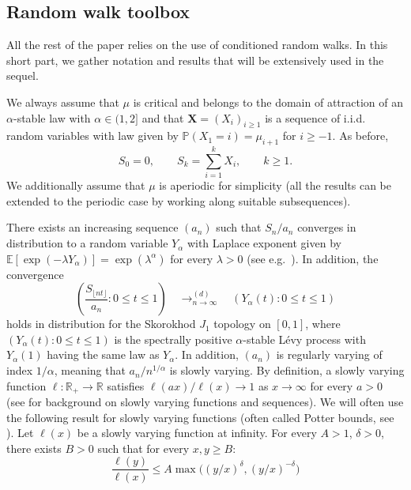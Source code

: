 \documentclass[a4paper,11pt]{article}
\DeclareRobustCommand{\P}{\mathbb{P}}
\DeclareRobustCommand{\1}{\mathbf{1}}
\newcommand{\R}{\mathbb{R}}
\newcommand\Es[1]{\mathbb{E}\left[#1\right]}
\begin{document}
\subsection{Random walk toolbox}
\label{sec:toolbox}

All the rest of the paper relies on the use of conditioned random walks. In this short part, we gather notation and results that will be extensively used in the sequel.

We always assume that $\mu$ is critical and belongs to the domain of attraction of an $\alpha$-stable law with $\alpha \in (1,2]$ and that $\mathbf{X}=(X_i)_{i \geq 1}$ is a sequence of i.i.d. random variables with law given by $\P(X_{1}=i)=\mu_{i+1}$ for $i \geq -1$. As before,
$$S_0 = 0, \qquad S_k = \sum_{i=1}^k X_i, \qquad k \geq 1.$$
We additionally assume that $\mu$ is aperiodic for simplicity (all the results can be extended to the periodic case by working along suitable subsequences).

There exists an increasing sequence $(a_{n})$ such that $S_{n}/a_{n}$ converges in distribution to a random variable $Y_{\alpha}$ with Laplace exponent given by $\Es{ \exp(- \lambda Y_{\alpha})}= \exp(\lambda ^ \alpha)$ for every $\lambda>0$ (see e.g.~\cite[Sec.~XVII.5]{Fel71}). In addition, the convergence
\begin{equation}
\label{eq:cvlaw}  \left(\frac{S_{\lfloor  n t \rfloor}}{a_{n}} : 0 \leq t \leq  1 \right) \quad \mathop{\longrightarrow}^{(d)}_{n \rightarrow \infty} \quad (Y_{\alpha}(t): 0 \leq t \leq 1)
\end{equation}
holds in distribution for the Skorokhod $J_{1}$ topology on $[0,1]$, where $ (Y_{\alpha}(t): 0 \leq t \leq 1)$ is the spectrally positive $\alpha$-stable Lévy process with $Y_{\alpha}(1)$ having the same law as $Y_{\alpha}$. In addition, $(a_{n})$ is regularly varying of index $1/\alpha$, meaning that $a_{n}/n^{1/\alpha}$ is slowly varying. By definition, a slowly varying function $\ell : \R_{+} \rightarrow\R$ satisfies $\ell(ax)/\ell(x) \rightarrow1$ as $x \rightarrow\infty$ for every $a>0$ (see \cite{bingham1989regular} for background on slowly varying functions and sequences). We will often use the following result for slowly varying functions (often called Potter bounds, see \cite[Theorem 1.5.6]{bingham1989regular}). Let $\ell(x)$ be a slowly varying function at infinity. For every $A>1$, $\delta>0$, there exists $B>0$ such that for every $x,y\geq B$:
\begin{equation}\label{eq: potter_bound}
    \frac{\ell(y)}{\ell(x)}\leq A \max \big( (y/x)^{\delta}, (y/x)^{-\delta}\big)
\end{equation}
\end{document}
